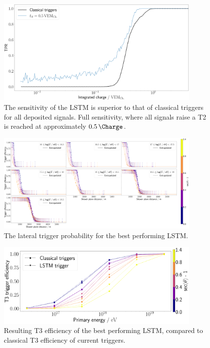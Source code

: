 \begin{figure}
	\centering
	\includegraphics[width=0.9\textwidth]{./plots/LSTM_charge_TPR.png}
	\caption{The sensitivity of the LSTM is superior to that of classical triggers for all deposited signals. Full sensitivity, where all signals raise a T2 is 
	reached at approximately $\SI{0.5}{\Charge}$.}
	\label{fig:LSTM-charge-TPR}
\end{figure}

\begin{figure}
	\centering
	\includegraphics[width=0.9\textwidth]{./plots/LSTM_LTP.png}
	\caption{The lateral trigger probability for the best performing LSTM. }
	\label{fig:LSTM-LTP}
\end{figure}

\begin{figure}
	\centering
	\includegraphics[width=0.9\textwidth]{./plots/LSTM_T3_efficiency.png}
	\caption{Resulting T3 efficiency of the best performing LSTM, compared to classical T3 efficiency of current triggers.}
	\label{fig:LSTM-t3-efficiency}
\end{figure}
